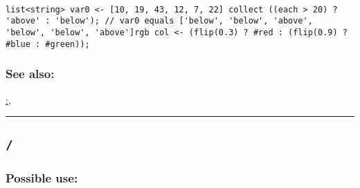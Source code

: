 \documentclass[]{book}
\theoremstyle{definition}
\theoremstyle{definition}
\theoremstyle{definition}
\theoremstyle{remark}
\begin{document}
\begin{verbatim}
 
list<string> var0 <- [10, 19, 43, 12, 7, 22] collect ((each > 20) ? 'above' : 'below'); // var0 equals ['below', 'below', 'above', 'below', 'below', 'above']rgb col <- (flip(0.3) ? #red : (flip(0.9) ? #blue : #green)); 
\end{verbatim}

\subsubsection{See also:}\label{see-also-4}

\href{OperatorsAA\#:}{:},

\begin{center}\rule{0.5\linewidth}{\linethickness}\end{center}

\subsection{\texorpdfstring{\texttt{/}}{/}}\label{section-7}

\subsubsection{Possible use:}\label{possible-use-6}
\end{document}
